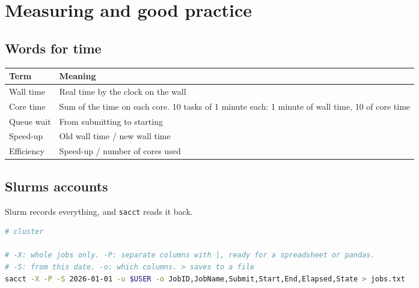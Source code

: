 \chapter{Measuring and good practice}
\label{ch:practice}

\section{Words for time}\label{words-for-time}

{\def\LTcaptype{none} %
\begin{longtable}[]{@{}
  >{\raggedright\arraybackslash}p{}
  >{\raggedright\arraybackslash}p{}@{}}
\toprule\noalign{}
\begin{minipage}[b]{\linewidth}\raggedright
Term
\end{minipage} & \begin{minipage}[b]{\linewidth}\raggedright
Meaning
\end{minipage} \\
\midrule\noalign{}
\endhead
\bottomrule\noalign{}
\endlastfoot
Wall time & Real time by the clock on the wall \\
Core time & Sum of the time on each core. 10 tasks of 1 minute each: 1 minute of wall time, 10 of core time \\
Queue wait & From submitting to starting \\
Speed-up & Old wall time / new wall time \\
Efficiency & Speed-up / number of cores used \\
\end{longtable}
}

\section{Slurm\textquotesingle s accounts}\label{slurms-accounts}

Slurm records everything, and \texttt{sacct} reads it back.

\begin{lstlisting}[language=bash]
# cluster

# -X: whole jobs only. -P: separate columns with |, ready for a spreadsheet or pandas.
# -S: from this date. -o: which columns. > saves to a file
sacct -X -P -S 2026-01-01 -u $USER -o JobID,JobName,Submit,Start,End,Elapsed,State > jobs.txt
\end{lstlisting}

